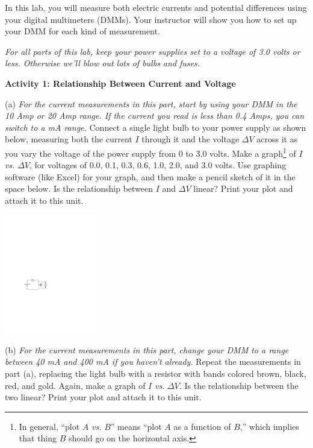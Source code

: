 In this lab, you will measure both electric currents and potential differences using your digital multimeters (DMMs).  Your instructor will show you how to set up your DMM for each kind of measurement.

\begin{newboxed}
\textit{For all parts of this lab, keep your power supplies set to a voltage of 3.0 volts or less.  Otherwise we'll blow out lots of bulbs and fuses.}
\end{newboxed}

\vspace{0.1 in}
\textbf{Activity 1: Relationship Between Current and Voltage}

(a) \textit{For the current measurements in this part, start by using your DMM in the 10 Amp or 20 Amp range.  If the current you read is less than 0.4 Amps, you can switch to a mA range.} Connect a single light bulb to your power supply as shown below, measuring both the current $I$ through it and the voltage $\Delta V$ across it as you vary the voltage of the power supply from 0 to 3.0 volts.  Make a graph\footnote{In general, ``plot $A$ \textit{vs.} $B$'' means ``plot $A$ as a function of $B$,'' which implies that thing $B$ should go on the horizontal axis.} of $I$ \textit{vs.} $\Delta V$, for voltages of 0.0, 0.1, 0.3, 0.6, 1.0, 2.0, and 3.0 volts.  Use graphing software (like Excel) for your graph, and then make a pencil sketch of it in the space below.  Is the relationship between $I$ and $\Delta V$ linear? Print your plot and attach it to this unit.

\hspace{0.5in}\includegraphics[width=0.3\textwidth]{electric_circuits2/circ_diag1.pdf}
\answerspace{0.5 in}

(b) \textit{For the current measurements in this part, change your DMM to a range between 40 mA and 400 mA if you haven't already.} Repeat the measurements in part (a), replacing the light bulb with a resistor with bands colored brown, black, red, and gold.  Again, make a graph of $I$ \textit{vs.} $\Delta V$.  
Is the relationship between the two linear? Print your plot and attach it to this unit.
\answerspace{1 in}

